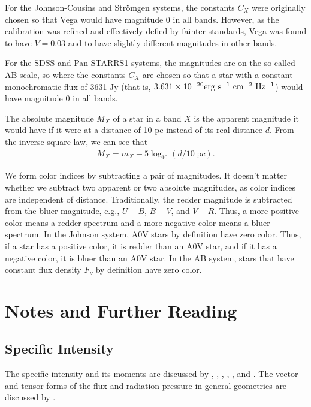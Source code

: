 \newslide

For the Johnson-Cousins and Strömgen systems, the constants $C_X$ were originally chosen so that Vega would have magnitude 0 in all bands. However, as the calibration was refined and effectively defied by fainter standards, Vega was found to have $V = 0.03$ and to have slightly different magnitudes in other bands.

For the SDSS and Pan-STARRS1 systems, the magnitudes are on the so-called AB scale, so where the constants $C_X$ are chosen so that a star with a constant monochromatic flux of 3631 Jy (that is, $3.631 \times 10^{-20}\space\mathrm{erg~s^{-1}~cm^{-2}~Hz^{-1}}$) would have magnitude 0 in all bands.

\newslide

The absolute magnitude $M_X$ of a star in a band $X$ is the
apparent magnitude it would have if it were at a distance of 10
pc instead of its real distance $d$. From the inverse square law,
we can see that
\begin{align}
M_X = m_X - 5 \log_{10} (d/10\;{\mathrm pc}).
\end{align}

\newslide

We form color indices by subtracting a pair of magnitudes. It doesn't matter whether we subtract two apparent or
two absolute magnitudes, as color indices are independent of distance. Traditionally, the redder
magnitude is subtracted from the bluer magnitude, e.g., $U-B$, $B-V$, and $V-R$. Thus, a more positive color means a redder spectrum and a more negative color means a bluer spectrum.
In the Johnson system, A0V stars by definition have zero color. Thus, if a star has a
positive color, it is redder than an A0V star, and if it has a negative
color, it is bluer than an A0V star. In the AB system, stars that have constant flux density $F_\nu$ by definition have zero color.

\newslide

\section{Notes and Further Reading}

\subsection{Specific Intensity}

The specific intensity and its moments are discussed by
\citet[pp.\ 2--18]{Mihalas-1978}, \citet[pp.\ 2--8]{Rybicki-1979},
\citet[ch.\ 4 and 5]{Boehm-Vitense-1989}, \citet[pp.\ 3--8 and
  pp.\ 11--12]{Shu-1991}, \citet[ch.\ 5]{Gray-1992}, and
\citet[pp.\ 9--12]{Rutten}. The vector and tensor forms of the flux and
radiation pressure in general geometries are discussed by
\citet[pp.\ 9--19]{Mihalas-1978}. 

